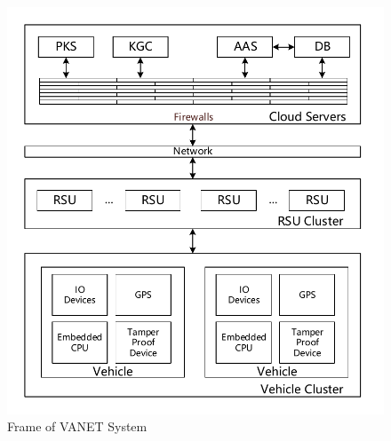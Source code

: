 \documentclass[smallextended]{svjour3}       %
\begin{document}
\begin{itemize}
	

	
	\begin{figure}[htb]
		\centering
		\includegraphics[width=4.5in, keepaspectratio]{layer.pdf}
		\caption{Frame of VANET System}
		\label{frame}
	\end{figure}



\end{itemize}

 
\end{document}

